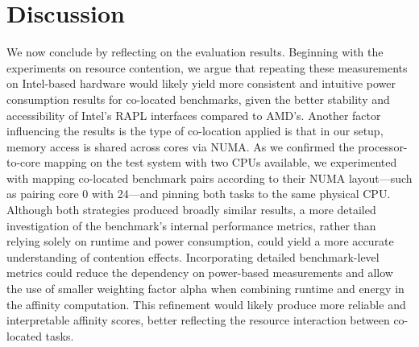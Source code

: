 \section{Discussion}
\label{cha:discussion}
We now conclude by reflecting on the evaluation results.
Beginning with the experiments on resource contention, we argue that repeating these measurements on Intel-based hardware would likely yield more consistent and intuitive power consumption results for co-located benchmarks, given the better stability and accessibility of Intel's RAPL interfaces compared to AMD's.
Another factor influencing the results is the type of co-location applied is that in our setup, memory access is shared across cores via NUMA. As we confirmed the processor-to-core mapping on the test system with two CPUs available, we experimented with mapping co-located benchmark pairs according to their NUMA layout—such as pairing core 0 with 24—and pinning both tasks to the same physical CPU. Although both strategies produced broadly similar results, a more detailed investigation of the benchmark's internal performance metrics, rather than relying solely on runtime and power consumption, could yield a more accurate understanding of contention effects.
Incorporating detailed benchmark-level metrics could reduce the dependency on power-based measurements and allow the use of smaller weighting factor alpha when combining runtime and energy in the affinity computation. This refinement would likely produce more reliable and interpretable affinity scores, better reflecting the resource interaction between co-located tasks.

